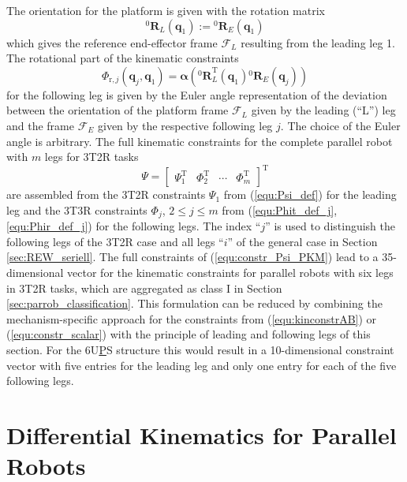 \documentclass[robotics,article,accept,moreauthors,pdftex]{Definitions/mdpi}
\newcommand{\bm}[1]{\boldsymbol{#1}}
\newcommand{\rotmat}[2]{{{ }^{#1}\boldsymbol{R}}_{#2}}
\newcommand{\transp}[0]{{\mathrm{T}}}
\newcommand{\ks}[1]{{\mathcal{F}}_{#1}}
\let\Phi\varPhi
\let\Psi\varPsi
\begin{document}
The orientation for the platform is given with the rotation matrix
%
\begin{equation}
\rotmat{0}{L}(\bm{q}_1)
:= 
\rotmat{0}{E}(\bm{q}_1)
\end{equation}
%
which gives the reference end-effector frame $\ks{L}$ resulting from the leading leg 1.
The rotational part of the kinematic constraints
%
\begin{equation}
\bm{\Phi}_{\mathrm{r},j}(\bm{q}_j,\bm{q}_1)
=
\bm{\alpha}(\rotmat{0}{L}^\mathrm{T}(\bm{q}_1)\rotmat{0}{E}(\bm{q}_j))
\label{equ:Phir_def_j}
\end{equation}
%
for the following leg is given by the Euler angle representation of the deviation between the orientation of the platform frame $\ks{L}$ given by the leading (``L'') leg and the frame $\ks{E}$ given by the respective following leg $j$.
The choice of the Euler angle  is arbitrary.
The full kinematic constraints for the complete parallel robot with $m$ legs for 3T2R tasks
%
\begin{equation}
\bm{\Psi}
=
\begin{bmatrix}
\bm{\Psi}_1^\transp &
\bm{\Phi}_2^\transp &
\cdots &
\bm{\Phi}_m^\transp
\end{bmatrix}^\transp
\label{equ:constr_Psi_PKM}
\end{equation}
%
are assembled from the 3T2R constraints $\bm{\Psi}_1$ from (\ref{equ:Psi_def}) for the leading leg and the 3T3R constraints $\bm{\Phi}_j$, $2\le{}j\le{}m$ from (\ref{equ:Phit_def_j},\ref{equ:Phir_def_j}) for the following legs.
The index ``$j$'' is used to distinguish the following legs of the 3T2R case and all legs ``$i$'' of the general case in Section\,\ref{sec:REW_seriell}.
%
The full constraints of (\ref{equ:constr_Psi_PKM}) lead to a 35-dimensional vector for the kinematic constraints for parallel robots with six legs in 3T2R tasks, which are aggregated as class I in Section\,\ref{sec:parrob_classification}.
This formulation can be reduced by combining the mechanism-specific approach for the constraints from (\ref{equ:kinconstrAB}) or (\ref{equ:constr_scalar}) with the principle of leading and following legs of this section.
For the 6U\underline{P}S structure this would result in a 10-dimensional constraint vector with five entries for the leading leg and only one entry for each of the five following legs.

\section{Differential Kinematics for Parallel Robots}
\label{sec:ZB_Anwendung}
\end{document}
